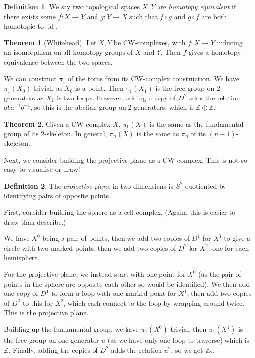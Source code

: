 \documentclass[a4paper,12pt]{article}
\newcommand{\ZZ}{\mathbb{Z}}
\newcommand{\of}{\circ}
\theoremstyle{definition}
\newtheorem*{thm}{Theorem}
\newtheorem*{defn}{Definition}
\begin{document}
\begin{defn}
	We say two topological spaces $X, Y$ are \emph{homotopy equivalent} if there exists some $f: X\to Y$ and $g: Y\to X$ such that $f\of g$ and $g\of f$ are both homotopic to $\operatorname{id}$.
\end{defn}

\begin{thm}[Whitehead]
	Let $X, Y$ be CW-complexes, with $f: X\to Y$ inducing an isomorphism on all homotopy groups of $X$ and $Y$.
	Then $f$ gives a homotopy equivalence between the two spaces.
\end{thm}

We can construct $\pi_1$ of the torus from its CW-complex construction.
We have $\pi_1(X_0)$ trivial, as $X_0$ is a point.
Then $\pi_1(X_1)$ is the free group on 2 generators as $X_1$ is two loops.
However, adding a copy of $D^2$ adds the relation $aba^{-1}b^{-1}$, so this is the abelian group on 2 generators, which is $\ZZ\oplus\ZZ$. 

\begin{thm}
	Given a CW-complex $X$, $\pi_1(X)$ is the same as the fundamental group of its 2-skeleton.
	In general, $\pi_n(X)$ is the same as $\pi_n$ of its $(n-1)$-skeleton.
\end{thm}

Next, we consider building the projective plane as a CW-complex.
This is not so easy to visualise or draw!

\begin{defn}
The \emph{projective plane} in two dimensions is $S^2$ quotiented by identifying pairs of opposite points.
\end{defn}

First, consider building the sphere as a cell complex.
(Again, this is easier to draw than describe.)

We have $X^0$ being a pair of points, then we add two copies of $D^1$ for $X^1$ to give a circle with two marked points, then we add two copies of $D^2$ for $X^2$: one for each hemisphere.

For the projective plane, we instead start with one point for $X^0$ (as the pair of points in the sphere are opposite each other so would be identified).
We then add one copy of $D^1$ to form a loop with one marked point for $X^1$, then add two copies of $D^2$ to this for $X^2$, which each connect to the loop by wrapping around twice.
This is the projective plane.

Building up the fundamental group, we have $\pi_1(X^0)$ trivial, then $\pi_1(X^1)$ is the free group on one generator $u$ (as we have only one loop to traverse) which is $\ZZ$.
Finally, adding the copies of $D^2$ adds the relation $u^2$, so we get $\ZZ_2$.
\end{document}
